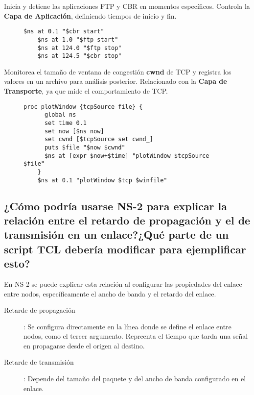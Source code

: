 \noindent Inicia y detiene las aplicaciones FTP y CBR en momentos espec\'ificos. Controla la \textbf{Capa de Aplicaci\'on}, definiendo
tiempos de inicio y fin.
\begin{figure}[H]
  \begin{lstlisting}[frame=single, breaklines=true, basicstyle=\footnotesize\ttfamily, breakatwhitespace=false, 
    columns=flexible, tabsize=2, showstringspaces=false]
    $ns at 0.1 "$cbr start"
    $ns at 1.0 "$ftp start"
    $ns at 124.0 "$ftp stop"
    $ns at 124.5 "$cbr stop"
  \end{lstlisting}
\end{figure}

\noindent Monitorea el tamaño de ventana de congesti\'on \textbf{cwnd} de TCP y registra los valores en un archivo
para an\'alisis posterior. Relacionado con la \textbf{Capa de Transporte}, ya que mide el comportamiento de TCP.
\begin{figure}[H]
  \begin{lstlisting}[frame=single, breaklines=true, basicstyle=\footnotesize\ttfamily, breakatwhitespace=false, 
    columns=flexible, tabsize=2, showstringspaces=false]
    proc plotWindow {tcpSource file} {
      global ns
      set time 0.1
      set now [$ns now]
      set cwnd [$tcpSource set cwnd_]
      puts $file "$now $cwnd"
      $ns at [expr $now+$time] "plotWindow $tcpSource $file"
    }
    $ns at 0.1 "plotWindow $tcp $winfile"
  \end{lstlisting}
\end{figure}


\subsection*{¿C\'omo podr\'ia usarse NS-2 para explicar la relaci\'on entre el retardo de propagaci\'on y el de transmisi\'on en un
enlace?¿Qu\'e parte de un script TCL deber\'ia modificar para ejemplificar esto?}
\noindent En NS-2 se puede explicar esta relaci\'on al configurar las propiedades del enlace entre nodos, espec\'ificamente
el ancho de banda y el retardo del enlace.
\begin{description}
  \item[Retarde de propagaci\'on] : Se configura directamente en la l\'inea donde se define el enlace entre nodos, como el tercer
  argumento. Repreenta el tiempo que tarda una señal en propagarse desde el origen al destino.
  \item[Retarde de transmisi\'on] : Depende del tamaño del paquete y del ancho de banda configurado en el enlace.
\end{description}

